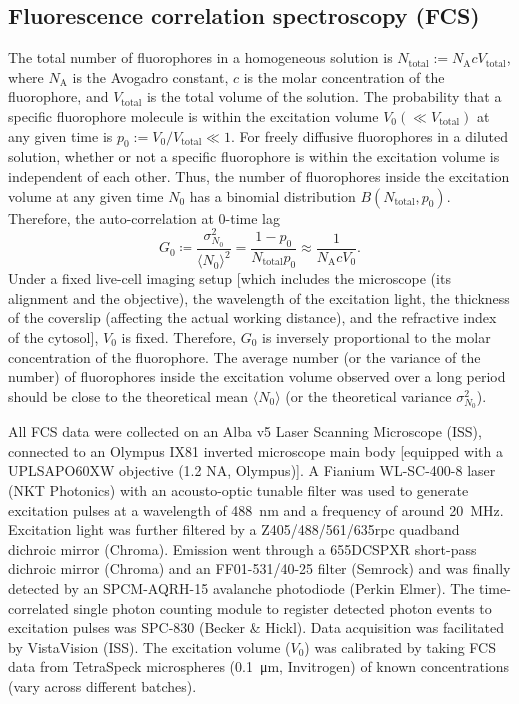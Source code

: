 \subsection{Fluorescence correlation spectroscopy (FCS)}
\label{FCSMethods}
The total number of fluorophores in a homogeneous solution is $N_\text{total} := N_\text{A}cV_\text{total}$, where $N_\text{A}$ is the Avogadro constant, $c$ is the molar concentration of the fluorophore, and $V_\text{total}$ is the total volume of the solution. The probability that a specific fluorophore molecule is within the excitation volume $V_0 (\ll V_\text{total})$ at any given time is $p_0 := V_0/V_\text{total}\ll1$. For freely diffusive fluorophores in a diluted solution, whether or not a specific fluorophore is within the excitation volume is independent of each other. Thus, the number of fluorophores inside the excitation volume at any given time $N_0$ has a binomial distribution $B(N_\text{total}, p_0)$. Therefore, the auto-correlation at 0-time lag
\begin{equation*}
    G_0 \coloneqq \dfrac{\sigma_{N_0}^2}{\langle N_0 \rangle^2} = \dfrac{1-p_0}{N_\text{total}p_0} \approx \dfrac{1}{N_\text{A}cV_0}.
\end{equation*}
Under a fixed live-cell imaging setup [which includes the microscope (its alignment and the objective), the wavelength of the excitation light, the thickness of the coverslip (affecting the actual working distance), and the refractive index of the cytosol], $V_0$ is fixed. Therefore, $G_0$ is inversely proportional to the molar concentration of the fluorophore. The average number (or the variance of the number) of fluorophores inside the excitation volume observed over a long period should be close to the theoretical mean $\langle N_0 \rangle$ (or the theoretical variance $\sigma_{N_0}^2$).

All FCS data were collected on an Alba v5 Laser Scanning Microscope (ISS), connected to an Olympus IX81 inverted microscope main body [equipped with a UPLSAPO60XW objective (1.2 NA, Olympus)]. A Fianium WL-SC-400-8 laser (NKT Photonics) with an acousto-optic tunable filter was used to generate excitation pulses at a wavelength of \SI{488}{nm} and a frequency of around \SI{20}{MHz}. Excitation light was further filtered by a Z405/488/561/635rpc quadband dichroic mirror (Chroma). Emission went through a 655DCSPXR short-pass dichroic mirror (Chroma) and an FF01-531/40-25 filter (Semrock) and was finally detected by an SPCM-AQRH-15 avalanche photodiode (Perkin Elmer). The time-correlated single photon counting module to register detected photon events to excitation pulses was SPC-830 (Becker \& Hickl). Data acquisition was facilitated by VistaVision (ISS). The excitation volume ($V_0$) was calibrated by taking FCS data from TetraSpeck\texttrademark{} microspheres (\SI{0.1}{\micro m}, Invitrogen) of known concentrations (vary across different batches).

